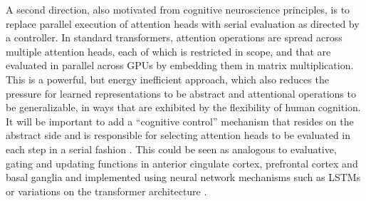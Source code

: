 
A second direction, also motivated from cognitive neuroscience principles, is to replace 
parallel execution of attention heads with serial evaluation as directed by a controller. 
In standard transformers, attention operations are spread across multiple attention heads,
each of which is restricted in scope, and that are evaluated in parallel across GPUs by embedding them in matrix
multiplication. This is a powerful, but energy inefficient approach, which also reduces the pressure for learned
representations to be abstract and attentional operations to be generalizable, in ways that are exhibited
by the flexibility of human cognition.  It will be important to add a ``cognitive control'' mechanism that resides on
the abstract side and is responsible for selecting attention heads to be evaluated in each step in a serial fashion \citep{cohen2017cognitive}.  This could be seen as analogous to evaluative, gating and updating functions in anterior cingulate cortex, prefrontal cortex and basal ganglia
\citep{frank2001interactions,evc,braver2000control,wmPFC}
and implemented using neural network mechanisms such as LSTMs \citep{lstm} or variations on the transformer
architecture \citep{gamr}.


